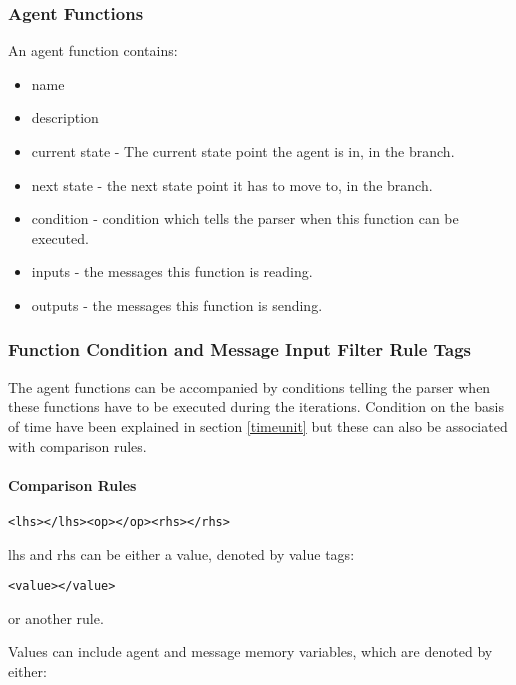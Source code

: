 \subsubsection{Agent Functions}
An agent function contains:
\begin{itemize}
\item name
\item description
\item current state - The current state point the agent is in, in
the branch.
\item next state - the next state point it has to move to, in the
branch.
\item condition - condition which tells the parser when this
function can be executed.
\item inputs - the messages this function is reading.
\item outputs - the messages this function is sending.
\end{itemize}

\subsubsection{Function Condition and Message Input Filter Rule
Tags}\label{functioncond}

The agent functions can be accompanied by conditions telling the
parser when these functions have to be executed during the
iterations. Condition on the basis of time have been explained in
section \ref{timeunit} but these can also be associated with
comparison rules.

\paragraph{Comparison Rules}

\begin{mylisting}
\begin{verbatim}
<lhs></lhs><op></op><rhs></rhs>
\end{verbatim}
\end{mylisting}

lhs and rhs can be either a value, denoted by value tags:

\begin{mylisting}
\begin{verbatim}
<value></value>
\end{verbatim}
\end{mylisting}

or another rule.

Values can include agent and message memory variables, which are denoted by either:

